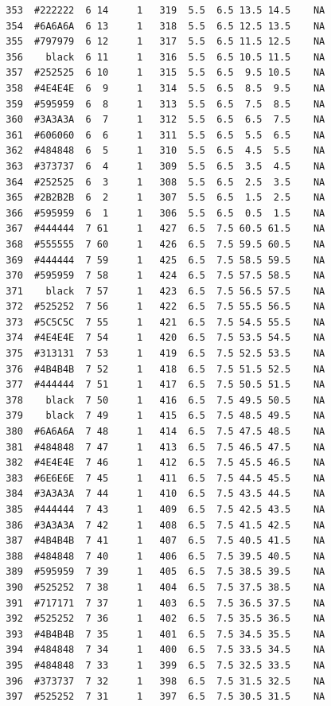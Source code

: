 \documentclass[12pt,twoside]{reedthesis}
\begin{document}
\begin{verbatim}
  353  #222222  6 14     1   319  5.5  6.5 13.5 14.5    NA
  354  #6A6A6A  6 13     1   318  5.5  6.5 12.5 13.5    NA
  355  #797979  6 12     1   317  5.5  6.5 11.5 12.5    NA
  356    black  6 11     1   316  5.5  6.5 10.5 11.5    NA
  357  #252525  6 10     1   315  5.5  6.5  9.5 10.5    NA
  358  #4E4E4E  6  9     1   314  5.5  6.5  8.5  9.5    NA
  359  #595959  6  8     1   313  5.5  6.5  7.5  8.5    NA
  360  #3A3A3A  6  7     1   312  5.5  6.5  6.5  7.5    NA
  361  #606060  6  6     1   311  5.5  6.5  5.5  6.5    NA
  362  #484848  6  5     1   310  5.5  6.5  4.5  5.5    NA
  363  #373737  6  4     1   309  5.5  6.5  3.5  4.5    NA
  364  #252525  6  3     1   308  5.5  6.5  2.5  3.5    NA
  365  #2B2B2B  6  2     1   307  5.5  6.5  1.5  2.5    NA
  366  #595959  6  1     1   306  5.5  6.5  0.5  1.5    NA
  367  #444444  7 61     1   427  6.5  7.5 60.5 61.5    NA
  368  #555555  7 60     1   426  6.5  7.5 59.5 60.5    NA
  369  #444444  7 59     1   425  6.5  7.5 58.5 59.5    NA
  370  #595959  7 58     1   424  6.5  7.5 57.5 58.5    NA
  371    black  7 57     1   423  6.5  7.5 56.5 57.5    NA
  372  #525252  7 56     1   422  6.5  7.5 55.5 56.5    NA
  373  #5C5C5C  7 55     1   421  6.5  7.5 54.5 55.5    NA
  374  #4E4E4E  7 54     1   420  6.5  7.5 53.5 54.5    NA
  375  #313131  7 53     1   419  6.5  7.5 52.5 53.5    NA
  376  #4B4B4B  7 52     1   418  6.5  7.5 51.5 52.5    NA
  377  #444444  7 51     1   417  6.5  7.5 50.5 51.5    NA
  378    black  7 50     1   416  6.5  7.5 49.5 50.5    NA
  379    black  7 49     1   415  6.5  7.5 48.5 49.5    NA
  380  #6A6A6A  7 48     1   414  6.5  7.5 47.5 48.5    NA
  381  #484848  7 47     1   413  6.5  7.5 46.5 47.5    NA
  382  #4E4E4E  7 46     1   412  6.5  7.5 45.5 46.5    NA
  383  #6E6E6E  7 45     1   411  6.5  7.5 44.5 45.5    NA
  384  #3A3A3A  7 44     1   410  6.5  7.5 43.5 44.5    NA
  385  #444444  7 43     1   409  6.5  7.5 42.5 43.5    NA
  386  #3A3A3A  7 42     1   408  6.5  7.5 41.5 42.5    NA
  387  #4B4B4B  7 41     1   407  6.5  7.5 40.5 41.5    NA
  388  #484848  7 40     1   406  6.5  7.5 39.5 40.5    NA
  389  #595959  7 39     1   405  6.5  7.5 38.5 39.5    NA
  390  #525252  7 38     1   404  6.5  7.5 37.5 38.5    NA
  391  #717171  7 37     1   403  6.5  7.5 36.5 37.5    NA
  392  #525252  7 36     1   402  6.5  7.5 35.5 36.5    NA
  393  #4B4B4B  7 35     1   401  6.5  7.5 34.5 35.5    NA
  394  #484848  7 34     1   400  6.5  7.5 33.5 34.5    NA
  395  #484848  7 33     1   399  6.5  7.5 32.5 33.5    NA
  396  #373737  7 32     1   398  6.5  7.5 31.5 32.5    NA
  397  #525252  7 31     1   397  6.5  7.5 30.5 31.5    NA

\end{verbatim}
\end{document}
